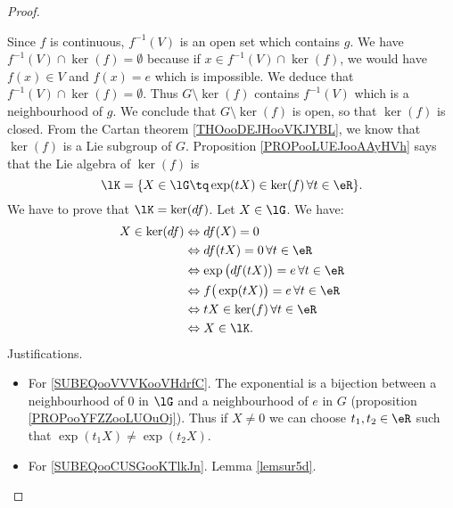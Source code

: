 \begin{proof}
\begin{subproof}
            Since \( f\) is continuous, \( f^{-1}(V)\) is an open set which contains \( g\). We have \( f^{-1}(V)\cap \ker(f)=\emptyset\) because if \( x\in f^{-1}(V)\cap\ker(f)\), we would have \( f(x)\in V\) and \( f(x)=e\) which is impossible. We deduce that \( f^{-1}(V)\cap\ker(f)=\emptyset\). Thus \( G\setminus\ker(f)\) contains \( f^{-1}(V)\) which is a neighbourhood of \( g\). We conclude that \( G\setminus \ker(f)\) is open, so that \( \ker(f)\) is closed.
            From the Cartan theorem \ref{THOooDEJHooVKJYBL}, we know that \( \ker(f)\) is a Lie subgroup of \( G\).
            Proposition \ref{PROPooLUEJooAAyHVh} says that the Lie algebra of \( \ker(f)\) is
            \begin{equation}
                \lK=\{ X\in \lG\tq \exp(tX)\in \ker(f)\,\forall t\in \eR \}.
            \end{equation}
            We have to prove that \( \lK=\ker(df)\). Let \( X\in \lG\). We have:
            \begin{subequations}
                \begin{align}
                    X\in\ker(df)&\Leftrightarrow df(X)=0\\
                    &\Leftrightarrow df(tX)=0\,\forall t\in \eR\\
                    &\Leftrightarrow \exp\big( df(tX) \big)=e\,\forall t\in \eR       \label{SUBEQooVVVKooVHdrfC}     \\
                    &\Leftrightarrow f\big( \exp(tX) \big)=e\,\forall t\in \eR  \label{SUBEQooCUSGooKTlkJn}     \\
                    &\Leftrightarrow tX\in\ker(f)\,\forall t\in \eR     \\
                    &\Leftrightarrow X\in\lK.
                \end{align}
            \end{subequations}
            Justifications.
            \begin{itemize}
                \item For \eqref{SUBEQooVVVKooVHdrfC}. The exponential is a bijection between a neighbourhood of \( 0\) in \( \lG\) and a neighbourhood of \( e\) in \( G\) (proposition \ref{PROPooYFZZooLUOuOj}). Thus if \( X\neq 0\) we can choose \( t_1,t_2\in \eR\) such that \( \exp(t_1X)\neq \exp(t_2X)\).
                \item For \eqref{SUBEQooCUSGooKTlkJn}. Lemma \ref{lemsur5d}.
            \end{itemize}
    \end{subproof}
\end{proof}

